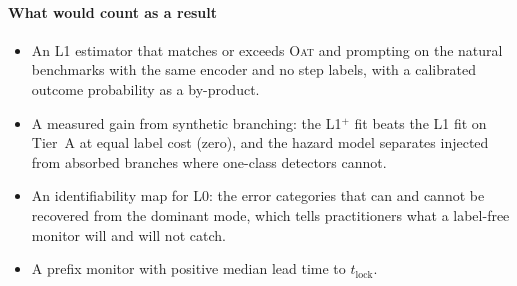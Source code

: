 \paragraph{What would count as a result}
\begin{itemize}[leftmargin=1.1em]
\item An L1 estimator that matches or exceeds \textsc{Oat} and prompting on the natural benchmarks with the same encoder and no step labels, with a calibrated outcome probability as a by-product.
\item A measured gain from synthetic branching: the L1$^{+}$ fit beats the L1 fit on Tier~A at equal label cost (zero), and the hazard model separates injected from absorbed branches where one-class detectors cannot.
\item An identifiability map for L0: the error categories that can and cannot be recovered from the dominant mode, which tells practitioners what a label-free monitor will and will not catch.
\item A prefix monitor with positive median lead time to $t_{\mathrm{lock}}$.
\end{itemize}
